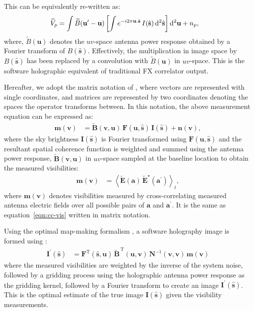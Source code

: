 \documentclass[a4paper,fleqn,usenatbib]{mnras}
\newcommand{\dif}{\mathrm{d}}
\begin{document}
This can be equivalently re-written as:
\begin{align}\label{eqn:software-holography}
  \widetilde{V}_p &= \int \widetilde{B}(\mathbf{u}^\prime-\mathbf{u}) \left[\int e^{-i2\pi\mathbf{u}.\hat{\mathbf{s}}}\,I(\hat{\mathbf{s}})\,\dif^2\hat{\mathbf{s}}\right]\dif^2\mathbf{u}\vphantom{\int} + n_p,
\end{align}
where, $\widetilde{B}(\mathbf{u})$ denotes the $uv$-space antenna power response
obtained by a Fourier transform of $B(\hat{\mathbf{s}})$. Effectively, the
multiplication in image space by $B(\hat{\mathbf{s}})$ has been replaced by a
convolution with $\widetilde{B}(\mathbf{u})$ in $uv$-space. This is the software
holographic equivalent of traditional FX correlator output. 

Hereafter, we adopt the matrix notation of \citet{mor11}, where vectors are 
represented with single coordinates, and matrices are represented by two 
coordinates denoting the spaces the operator transforms between. 
In this notation, the above measurement equation can be expressed as:
\begin{align}
  \mathbf{m}(\mathbf{v}) &= \widetilde{\mathbf{B}}(\mathbf{v},\mathbf{u})\,\mathbf{F}(\mathbf{u},\hat{\mathbf{s}})\,\mathbf{I}(\hat{\mathbf{s}}) + \mathbf{n}(\mathbf{v}),
\end{align}
where the sky brightness $\mathbf{I}(\hat{\mathbf{s}})$ is Fourier transformed using
$\mathbf{F}(\mathbf{u},\hat{\mathbf{s}})$ and the resultant spatial coherence
function is weighted and summed using the antenna power response,
$\widetilde{\mathbf{B}}(\mathbf{v},\mathbf{u})$ in $uv$-space sampled at the baseline
location to obtain the measured visibilities:
\begin{align}
  \mathbf{m}(\mathbf{v}) &= \left\langle \widetilde{\mathbf{E}}(\mathbf{a})\,\widetilde{\mathbf{E}}^\star(\mathbf{a}^\prime)\right\rangle_t, \label{eqn:matrix-cc-vis}
\end{align}
where $\mathbf{m}(\mathbf{v})$ denotes visibilities measured by cross-correlating
measured antenna electric fields over all possible pairs of $\mathbf{a}$ and
$\mathbf{a}^\prime$. It is the same as equation~\ref{eqn:cc-vis} written in
matrix notation.

Using the optimal map-making formalism \citep{teg97a,teg97b}, a software
holography image is formed using \citep{mor09}:
\begin{align}
  \mathbf{I}^\prime(\hat{\mathbf{s}}) &= \mathbf{F}^\textrm{T}(\hat{\mathbf{s}},\mathbf{u})\,\widetilde{\mathbf{B}}^{\,\textrm{T}}(\mathbf{u},\mathbf{v})\,\mathbf{N}^{-1}(\mathbf{v},\mathbf{v})\,\mathbf{m}(\mathbf{v}) \label{eqn:dirty-image-FX}
\end{align}
where the measured visibilities are weighted by the inverse of the system noise,
followed by a gridding process using the holographic antenna power response as 
the gridding kernel, followed by a Fourier transform to create an image
$\mathbf{I}^\prime(\hat{\mathbf{s}})$. This is the optimal estimate of the true image 
$\mathbf{I}(\hat{\mathbf{s}})$ given the visibility measurements.
\end{document}
